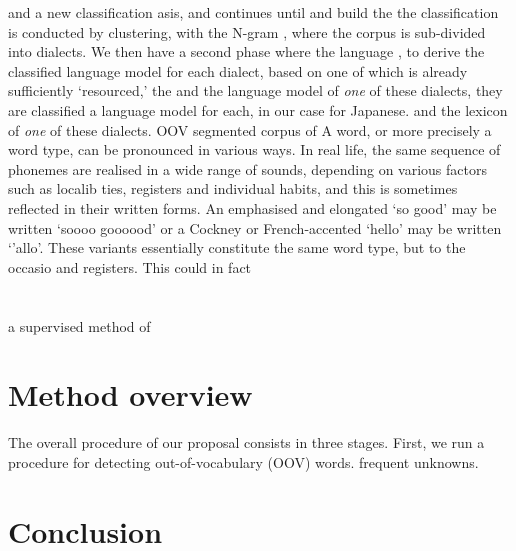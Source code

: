 \documentclass{article}
\begin{document}
 and a new classification asis, and continues until   and build the    the classification is conducted by clustering, with the N-gram , where the corpus is sub-divided into dialects. We then have a second phase where the language , to derive the classified language model for each dialect, based on   one of which is already sufficiently `resourced,' the   and the language model of \emph{one} of these dialects, they are classified   a language model for each, in our case for Japanese.  and the lexicon of \emph{one} of these dialects.  OOV segmented corpus of  A word, or more precisely a word type, can be pronounced in various ways. In real life, the same sequence of phonemes are realised in a wide range of sounds, depending on various factors such as localib
ties, registers and individual habits, and this is sometimes reflected in their written forms. An emphasised and elongated `so good' may be written `soooo goooood' or a Cockney or French-accented `hello' may be written `'allo'. These variants essentially constitute the same word type, but to the  occasio and registers. This could in fact 

\section{}




\cite{SaitoEtAl14}  a supervised method of


\section{Method overview}

The overall procedure of our proposal consists in three stages. First, we run a procedure for detecting out-of-vocabulary (OOV) words. frequent unknowns.

\section{Conclusion}
\end{document}
